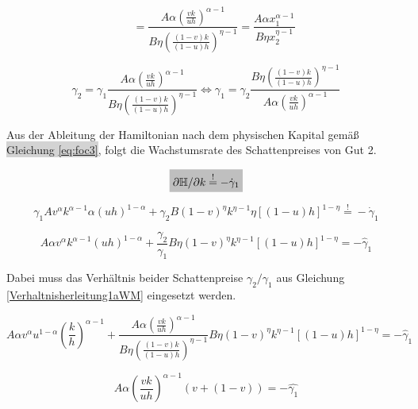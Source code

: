 	\begin{equation}
		\quad ~~=\frac{A\alpha \left(\frac{vk}{uh}\right)^{\alpha-1}}{B\eta\left(\frac{(1-v)k}{(1-u)h}\right)^{\eta-1}}=\frac{A\alpha x_1^{\alpha-1}}{B\eta x_2^{\eta-1}}\label{Verhaltnisherleitung1aWM}
	\end{equation}


	\begin{equation}
		\gamma_2=\gamma_1\frac{A\alpha \left(\frac{vk}{uh}\right)^{\alpha-1}}{B\eta\left(\frac{(1-v)k}{(1-u)h}\right)^{\eta-1}}\Longleftrightarrow \gamma_1=\gamma_2\frac{B\eta\left(\frac{(1-v)k}{(1-u)h}\right)^{\eta-1}}{A\alpha \left(\frac{vk}{uh}\right)^{\alpha-1}}\label{Verhaltnisherleitung2WM}
	\end{equation}


Aus der Ableitung der Hamiltonian nach dem physischen Kapital gemä{\ss} \colorbox{lightgray}{Gleichung \eqref{eq:foc3}}, folgt die Wachstumsrate des Schattenpreises von Gut 2.\newline


	\begin{equation*}
		\colorbox{lightgray}{$\partial\mathbb{H}/\partial k\overset{!}{=}-\dot{\gamma}_1$}
	\end{equation*}


	\begin{equation}
		\gamma_{1}A v^{\alpha}k^{\alpha -1} \alpha(u h)^{1- \alpha} + \gamma_{2}B(1- v)^{\eta} k^{\eta -1} \eta \left [ (1-u)h \right ]^{1- \eta}\overset{!}{=} - \dot{\gamma}_{1}\label{BedingungFoc3WM}
	\end{equation}


	\begin{equation*}
		 A \alpha v^{\alpha}k^{\alpha -1} (uh)^{1- \alpha} + \frac{\gamma_{2}}{\gamma_{1}}B\eta (1- v)^{\eta} k^{\eta -1} \left [(1-u)h \right ]^{1- \eta}= - \hat{\gamma}_{1}
	\end{equation*}


Dabei muss das Verhältnis beider Schattenpreise $\gamma_2/\gamma_1$ aus Gleichung \eqref{Verhaltnisherleitung1aWM} eingesetzt werden.


	\begin{equation*}
		 A \alpha v^{\alpha} {u}^{1- \alpha} \left(\frac{k}{h}\right)^{\alpha -1}+ \frac{A\alpha \left(\frac{vk}{uh}\right)^{\alpha-1}}{B\eta\left(\frac{(1-v)k}{(1-u)h}\right)^{\eta-1}}B\eta (1- v)^{\eta} k^{\eta -1} \left [(1-u)h \right ]^{1- \eta}= - \hat{\gamma}_{1}
	\end{equation*}


	\begin{equation*}
		 A \alpha \left(\frac{vk}{uh}\right)^{\alpha -1}(v+ (1- v))= -\hat{\gamma_{1}}
	\end{equation*}


